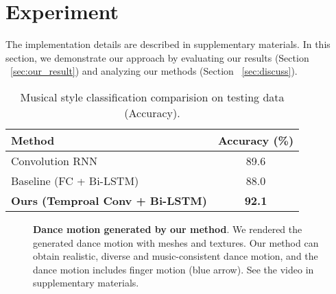 \section{Experiment}\label{sec:Experiment}
The implementation details are described in supplementary materials. In this section, we demonstrate our 
approach by evaluating our results (Section ~\ref{sec:our_result}) 
and analyzing our methods (Section ~\ref{sec:discuss}).
























\setlength{\tabcolsep}{4pt}
\begin{table}[t]
\begin{center}
\caption{
	Musical style classification comparision on testing data (Accuracy).
}
\label{table:music_attribute}
\begin{tabular}{l|c}
\hline
Method & Accuracy (\%)  \\
\hline
Convolution RNN\cite{choi2017convolutional} & 89.6 \\
Baseline (FC + Bi-LSTM) & 88.0   \\
\textbf{Ours (Temproal Conv + Bi-LSTM)} & \textbf{92.1} \\
\hline	
\end{tabular}
\end{center}
\end{table}
\setlength{\tabcolsep}{1.4pt}





\begin{figure*}[t]
    \centering
    \caption{\textbf{Dance motion generated by our method}. 
    We rendered the generated dance motion with meshes and textures. Our method can obtain 
    realistic, diverse and music-consistent dance motion, and the dance motion includes finger motion (blue arrow). 
    See the video in supplementary materials.}
    \label{fig:qualitative_result}
    \vspace{-2mm}
\end{figure*}
























